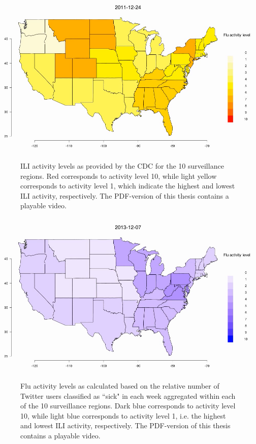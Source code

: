 \documentclass[11pt, a4paper,twoside]{report}\usepackage[]{graphicx}\usepackage[]{color}
\begin{document}
\begin{center}
\href{run:vids/1_cdc_flu_regio.avi}{\includegraphics[width=0.9\linewidth]{vids/1_cdc_flu_regio.png}}
\end{center}
\begin{figure}[htbp!]
\centering
  \caption{ILI activity levels as provided by the CDC for the 10 surveillance regions. Red corresponds to activity level 10, while light yellow corresponds to activity level 1, which indicate the highest and lowest ILI activity, respectively. The PDF-version of this thesis contains a playable video.}
    \label{fig:cdc_flu_regio}
\end{figure}
\clearpage
\begin{center}
\href{run:vids/2_twitter_flu_regio.avi}{\includegraphics[width=0.9\linewidth]{vids/2_twitter_flu_regio.png}}
\end{center}
\vspace{-0.2in}
\begin{figure}[htbp!]
\centering
  \caption{Flu activity levels as calculated based on the relative number of Twitter users classified as ``sick" in each week aggregated within each of the 10 surveillance regions. Dark blue corresponds to activity level 10, while light blue corresponds to activity level 1, i.e. the highest and lowest ILI activity, respectively. The PDF-version of this thesis contains a playable video.}
    \label{fig:twitter_flu_regio}
\end{figure}
\end{document}
